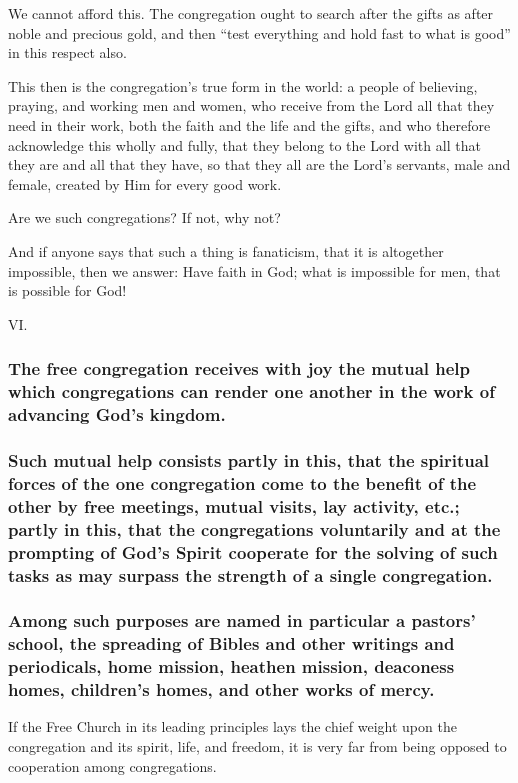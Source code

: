 We cannot afford this. The congregation ought to search after the gifts as after noble and precious gold, and then “test everything and hold fast to what is good” in this respect also.

This then is the congregation’s true form in the world: a people of believing, praying, and working men and women, who receive from the Lord all that they need in their work, both the faith and the life and the gifts, and who therefore acknowledge this wholly and fully, that they belong to the Lord with all that they are and all that they have, so that they all are the Lord’s servants, male and female, created by Him for every good work.

Are we such congregations? If not, why not?

And if anyone says that such a thing is fanaticism, that it is altogether impossible, then we answer: Have faith in God; what is impossible for men, that is possible for God!

VI.

\subsubsection{The free congregation receives with joy the mutual help which congregations can render one another in the work of advancing God’s kingdom.}

\subsubsection{Such mutual help consists partly in this, that the spiritual forces of the one congregation come to the benefit of the other by free meetings, mutual visits, lay activity, etc.; partly in this, that the congregations voluntarily and at the prompting of God’s Spirit cooperate for the solving of such tasks as may surpass the strength of a single congregation.}

\subsubsection{Among such purposes are named in particular a pastors’ school, the spreading of Bibles and other writings and periodicals, home mission, heathen mission, deaconess homes, children’s homes, and other works of mercy.}

If the Free Church in its leading principles lays the chief weight upon the congregation and its spirit, life, and freedom, it is very far from being opposed to cooperation among congregations.

